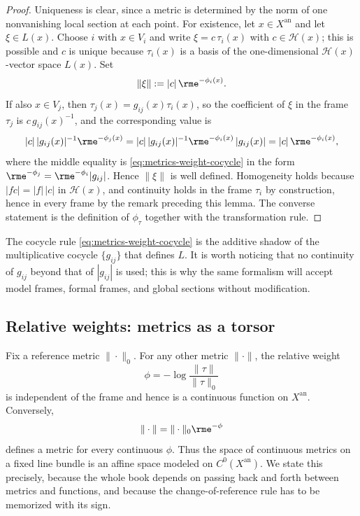 \begin{proof}
Uniqueness is clear, since a metric is determined by the norm of one
nonvanishing local section at each point. For existence, let
$x\in X^{\mathrm{an}}$ and let $\xi\in L(x)$. Choose $i$ with
$x\in V_i$ and write $\xi=c\,\tau_i(x)$ with $c\in\mathcal H(x)$; this
is possible and $c$ is unique because $\tau_i(x)$ is a basis of the
one-dimensional $\mathcal H(x)$-vector space $L(x)$. Set
\[
 \|\xi\|:=|c|\,\rme^{-\phi_i(x)} .
\]
If also $x\in V_j$, then $\tau_j(x)=g_{ij}(x)\tau_i(x)$, so the
coefficient of $\xi$ in the frame $\tau_j$ is $c\,g_{ij}(x)^{-1}$, and
the corresponding value is
\[
 |c|\,|g_{ij}(x)|^{-1}\rme^{-\phi_j(x)}
 =|c|\,|g_{ij}(x)|^{-1}\rme^{-\phi_i(x)}\,|g_{ij}(x)|
 =|c|\,\rme^{-\phi_i(x)},
\]
where the middle equality is \eqref{eq:metrics-weight-cocycle} in the form
$\rme^{-\phi_j}=\rme^{-\phi_i}|g_{ij}|$. Hence $\|\xi\|$ is well
defined. Homogeneity holds because $|fc|=|f|\,|c|$ in $\mathcal H(x)$,
and continuity holds in the frame $\tau_i$ by construction, hence in every
frame by the remark preceding this lemma. The converse statement is the
definition of $\phi_{\tau}$ together with the transformation rule.
\end{proof}

The cocycle rule \eqref{eq:metrics-weight-cocycle} is the additive shadow of
the multiplicative cocycle $\{g_{ij}\}$ that defines $L$. It is worth
noticing that no continuity of $g_{ij}$ beyond that of $|g_{ij}|$ is
used; this is why the same formalism will accept model frames, formal
frames, and global sections without modification.

\subsection{Relative weights: metrics as a torsor}

Fix a reference metric $\|\cdot\|_0$. For any other metric
$\|\cdot\|$, the relative weight
\[
 \phi=-\log\frac{\|\tau\|}{\|\tau\|_0}
\]
is independent of the frame and hence is a continuous function on
$X^{\mathrm{an}}$. Conversely,
\[
                        \|\cdot\|=\|\cdot\|_0\rme^{-\phi}
\]
defines a metric for every continuous $\phi$. Thus the space of continuous
metrics on a fixed line bundle is an affine space modeled on
$C^0(X^{\mathrm{an}})$. We state this precisely, because the whole book
depends on passing back and forth between metrics and functions, and because
the change-of-reference rule has to be memorized with its sign.

